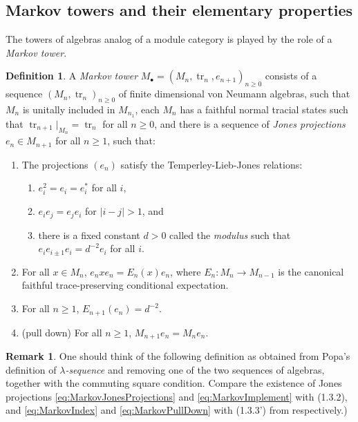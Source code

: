 \documentclass[11pt]{article}
\theoremstyle{plain}
\theoremstyle{definition}
\newtheorem{defn}[thm]{Definition}
\newtheorem{rem}[thm]{Remark}
\DeclareMathOperator{\tr}{tr}
\begin{document}
\subsection{Markov towers and their elementary properties}
\label{sec:MarkovTowersAndElementaryProperties}

The towers of algebras analog of a module category is played by the role of a \emph{Markov tower}.

\begin{defn}
A \emph{Markov tower} $M_\bullet = (M_n, \tr_n, e_{n+1})_{n\geq 0}$ consists of a sequence $(M_n, \tr_n)_{n\geq 0}$ of finite dimensional von Neumann algebras, such that $M_n$ is unitally included in $M_{n_1}$, each $M_n$ has a faithful normal tracial states such that $\tr_{n+1}|_{M_n} = \tr_n$ for all $n\geq 0$, and there is a sequence of \emph{Jones projections} $e_n \in M_{n+1}$ for all $n\geq 1$, such that:
\begin{enumerate}[label={\rm(M\arabic*)}]
\item
\label{eq:MarkovJonesProjections}
The projections $(e_n)$ satisfy the Temperley-Lieb-Jones relations:
\begin{enumerate}[label={\rm(\alph*)}]
\item
$e_i^2 = e_i = e_i^*$ for all $i$,
\item
$e_i e_j = e_j e_i$ for $|i-j|>1$, and
\item
there is a fixed constant $d>0$ called the \emph{modulus} such that $e_{i} e_{i\pm 1} e_i = d^{-2} e_i$ for all $i$.
\end{enumerate}
\item
\label{eq:MarkovImplement}
For all $x\in M_n$, $e_n x e_n = E_n(x)e_n$, where $E_n: M_n \to M_{n-1}$ is the canonical faithful trace-preserving conditional expectation.
\item
\label{eq:MarkovIndex}
For all $n\geq 1$, $E_{n+1}(e_n) = d^{-2}$.
\item
\label{eq:MarkovPullDown}
(pull down)
For all $n\geq 1$, $M_{n+1}e_n = M_n e_n$.

\end{enumerate}
\end{defn}

\begin{rem}
One should think of the following definition as obtained from Popa's definition of \emph{$\lambda$-sequence} \cite{MR1334479} and removing one of the two sequences of algebras, together with the commuting square condition.
Compare the existence of Jones projections \ref{eq:MarkovJonesProjections} and \ref{eq:MarkovImplement} with (1.3.2), and \ref{eq:MarkovIndex} and \ref{eq:MarkovPullDown} with (1.3.3') from \cite{MR1334479} respectively.)
\end{rem}
\end{document}
